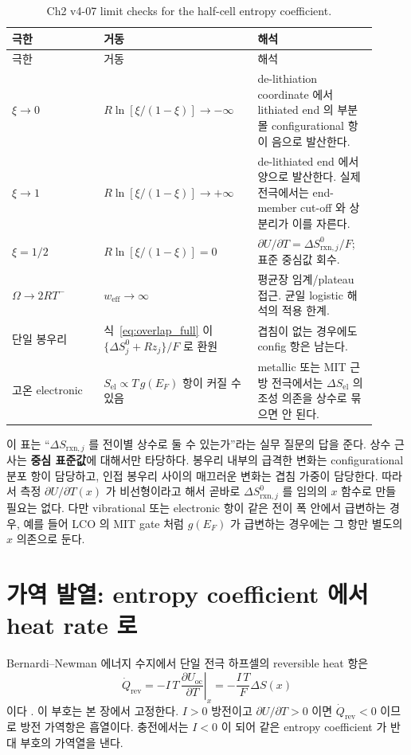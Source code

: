 \documentclass[11pt,a4paper]{article}
\newcommand{\rxn}{\mathrm{rxn}}
\newcommand{\rev}{\mathrm{rev}}
\newcommand{\oc}{\mathrm{oc}}
\newcommand{\el}{\mathrm{el}}
\newcommand{\eff}{\mathrm{eff}}
\begin{document}
\begin{longtable}{p{0.23\linewidth}p{0.38\linewidth}p{0.30\linewidth}}
\caption{Ch2 v4-07 limit checks for the half-cell entropy coefficient.}
\label{tab:limits}\\
\toprule
극한 & 거동 & 해석 \\
\midrule
\endfirsthead
\toprule
극한 & 거동 & 해석 \\
\midrule
\endhead
$\xi\rightarrow0$ &
$R\ln[\xi/(1-\xi)]\rightarrow-\infty$ &
de-lithiation coordinate 에서 lithiated end 의 부분몰 configurational 항이 음으로 발산한다. \\
$\xi\rightarrow1$ &
$R\ln[\xi/(1-\xi)]\rightarrow+\infty$ &
de-lithiated end 에서 양으로 발산한다. 실제 전극에서는 end-member cut-off 와 상분리가 이를 자른다. \\
$\xi=1/2$ &
$R\ln[\xi/(1-\xi)]=0$ &
$\partial U/\partial T=\Delta S_{\rxn,j}^0/F$; 표준 중심값 회수. \\
$\Omega\rightarrow2RT^{-}$ &
$w_{\eff}\rightarrow\infty$ &
평균장 임계/plateau 접근. 균일 logistic 해석의 적용 한계. \\
단일 봉우리 &
식~\eqref{eq:overlap_full} 이 $\{\Delta S_j^0+Rz_j\}/F$ 로 환원 &
겹침이 없는 경우에도 config 항은 남는다. \\
고온 electronic &
$S_{\el}\propto T\,g(E_F)$ 항이 커질 수 있음 &
metallic 또는 MIT 근방 전극에서는 $\Delta S_{\el}$ 의 조성 의존을 상수로 묶으면 안 된다. \\
\bottomrule
\end{longtable}

이 표는 ``$\Delta S_{\rxn,j}$ 를 전이별 상수로 둘 수 있는가''라는 실무 질문의 답을 준다.
상수 근사는 \textbf{중심 표준값}에 대해서만 타당하다. 봉우리 내부의 급격한 변화는
configurational 분포 항이 담당하고, 인접 봉우리 사이의 매끄러운 변화는 겹침 가중이 담당한다.
따라서 측정 $\partial U/\partial T(x)$ 가 비선형이라고 해서 곧바로 $\Delta S_{\rxn,j}^0$ 를 임의의
$x$ 함수로 만들 필요는 없다. 다만 vibrational 또는 electronic 항이 같은 전이 폭 안에서 급변하는
경우, 예를 들어 LCO 의 MIT gate 처럼 $g(E_F)$ 가 급변하는 경우에는 그 항만 별도의 $x$ 의존으로 둔다.

\section{가역 발열: entropy coefficient 에서 heat rate 로}
\label{sec:reversible_heat}
Bernardi--Newman 에너지 수지에서 단일 전극 하프셀의 reversible heat 항은
\begin{equation}
\boxed{\;\dot Q_\rev=-I\,T\,\left.\frac{\partial U_\oc}{\partial T}\right|_x
=-\frac{I\,T}{F}\Delta S(x)\;}
\label{eq:qrev_final}
\end{equation}
이다 \cite{bernardi1985,newman}. 이 부호는 본 장에서 고정한다. $I>0$ 방전이고
$\partial U/\partial T>0$ 이면 $\dot Q_\rev<0$ 이므로 방전 가역항은 흡열이다.
충전에서는 $I<0$ 이 되어 같은 entropy coefficient 가 반대 부호의 가역열을 낸다.
\end{document}
